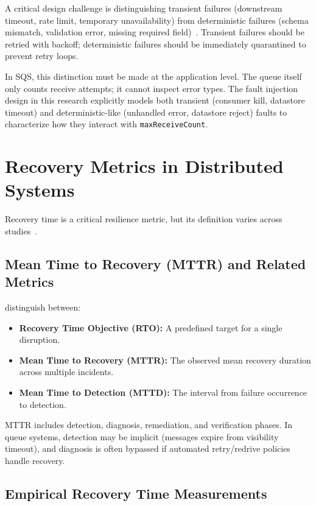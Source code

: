 A critical design challenge is distinguishing transient failures (downstream timeout, rate limit, temporary unavailability) from deterministic failures (schema mismatch, validation error, missing required field)~\citep{Laigner2024EventChallenges}. Transient failures should be retried with backoff; deterministic failures should be immediately quarantined to prevent retry loops.

In SQS, this distinction must be made at the application level. The queue itself only counts receive attempts; it cannot inspect error types. The fault injection design in this research explicitly models both transient (consumer kill, datastore timeout) and deterministic-like (unhandled error, datastore reject) faults to characterize how they interact with \texttt{maxReceiveCount}.

\section{Recovery Metrics in Distributed Systems}

Recovery time is a critical resilience metric, but its definition varies across studies~\citep{AWSResilience2023, Sreepathy2021ReliableActors}.

\subsection{Mean Time to Recovery (MTTR) and Related Metrics}

\citet{AWSResilience2023} distinguish between:
\begin{itemize}
    \item \textbf{Recovery Time Objective (RTO):} A predefined target for a single disruption.
    \item \textbf{Mean Time to Recovery (MTTR):} The observed mean recovery duration across multiple incidents.
    \item \textbf{Mean Time to Detection (MTTD):} The interval from failure occurrence to detection.
\end{itemize}

MTTR includes detection, diagnosis, remediation, and verification phases. In queue systems, detection may be implicit (messages expire from visibility timeout), and diagnosis is often bypassed if automated retry/redrive policies handle recovery.

\subsection{Empirical Recovery Time Measurements}

